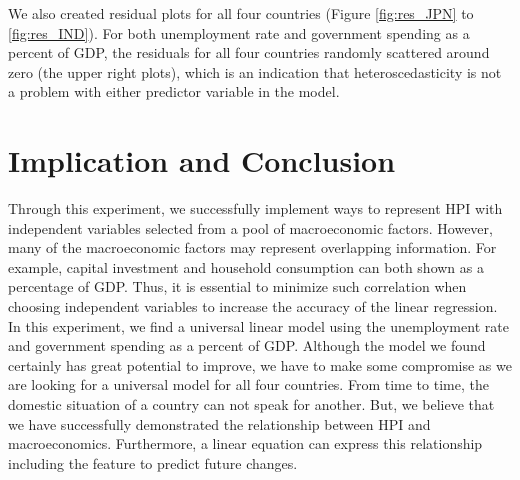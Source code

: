 \documentclass[11pt]{article}
\begin{document}
We also created residual plots for all four countries (Figure \ref{fig:res_JPN} to \ref{fig:res_IND}). For both unemployment rate and government spending as a percent of GDP, the residuals for all four countries randomly scattered around zero (the upper right plots), which is an indication that heteroscedasticity is not a problem with either predictor variable in the model\citep{Residual1}.

\section{Implication and Conclusion}\label{conclusion}
Through this experiment, we successfully implement ways to represent HPI with independent variables selected from a pool of macroeconomic factors. However, many of the macroeconomic factors may represent overlapping information. For example, capital investment and household consumption can both shown as a percentage of GDP. Thus, it is essential to minimize such correlation when choosing independent variables to increase the accuracy of the linear regression. In this experiment, we find a universal linear model using the unemployment rate and government spending as a percent of GDP. Although the model we found certainly has great potential to improve, we have to make some compromise as we are looking for a universal model for all four countries. From time to time, the domestic situation of a country can not speak for another. But, we believe that we have successfully demonstrated the relationship between HPI and macroeconomics. Furthermore, a linear equation can express this relationship including the feature to predict future changes. 

\newpage


\end{document}
